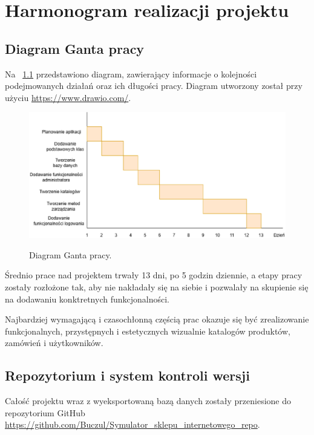 \chapter{Harmonogram realizacji projektu}
\label{cha:harmonogram}

\section{Diagram Ganta pracy}

Na \figurename~\ref{fig6} przedstawiono diagram, zawierający informacje o kolejności podejmowanych działań oraz ich długości pracy.
Diagram utworzony został przy użyciu \url{https://www.drawio.com/}.
\begin{figure}[H]
    \centering
    \includegraphics[width=\linewidth]{figures/fig_0006.eps}\\
    \caption{Diagram Ganta pracy.\label{fig6}}
\end{figure}

Średnio prace nad projektem trwały 13 dni, po 5 godzin dziennie, a etapy pracy zostały rozłożone tak, aby nie nakładały się na siebie i pozwalały na skupienie się na dodawaniu konktretnych funkcjonalności.

Najbardziej wymagającą i czasochłonną częścią prac okazuje się być zrealizowanie funkcjonalnych, przystępnych i estetycznych wizualnie 
katalogów produktów, zamówień i użytkowników.

\section{Repozytorium i system kontroli wersji}
Całość projektu wraz z wyeksportowaną bazą danych zostały przeniesione do repozytorium GitHub \url{https://github.com/Buczul/Symulator_sklepu_internetowego_repo}.